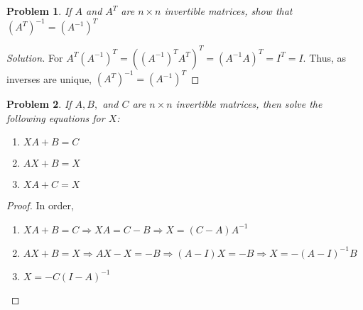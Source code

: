 \documentclass{article}
\theoremstyle{mystyle}
\newtheorem{problem}{Problem}[section]
\begin{document}
\begin{problem}
If $A$ and $A^T$ are $n\times n$ invertible matrices, show that $(A^T)^{-1} = (A^{-1})^T$
\end{problem}
\begin{proof}[Solution]
For $A^T(A^{-1})^T = ((A^{-1})^T A^T)^T = (A^{-1}A)^T = I^T = I$. Thus, as inverses are unique, $(A^T)^{-1} = (A^{-1})^T$
\end{proof}
\begin{problem}
If $A,B,$ and $C$ are $n\times n$ invertible matrices, then solve the following equations for $X$:
\begin{enumerate}
    \item $XA+B=C$
    \item $AX+B=X$
    \item $XA+C=X$
\end{enumerate}
\end{problem}
\begin{proof}
In order,
\begin{enumerate}
    \item $XA +B=C\Rightarrow XA = C-B \Rightarrow X = (C-A)A^{-1}$
    \item $AX+B = X\Rightarrow AX-X=-B \Rightarrow (A-I)X=-B \Rightarrow X = -(A-I)^{-1}B$
    \item $X = -C(I-A)^{-1}$
\end{enumerate}
\end{proof}
\end{document}
